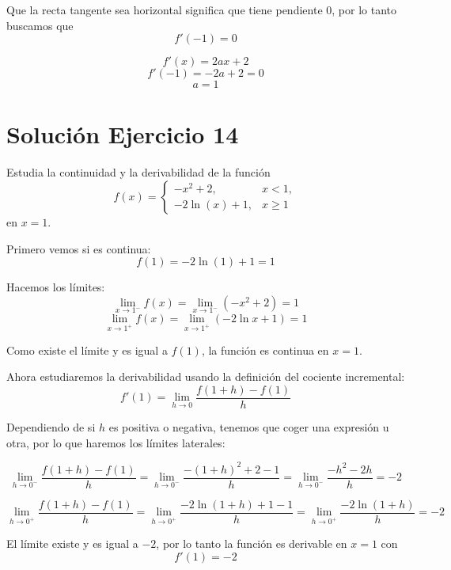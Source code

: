 \documentclass[12pt]{article}
\begin{document}
Que la recta tangente sea horizontal significa que tiene pendiente \(0\), por lo tanto
buscamos que
\[
f'(-1)=0
\]

\[
f'(x)=2ax+2
\]
\[
f'(-1)=-2a+2=0
\]
\[
a=1
\]

\section*{Solución Ejercicio 14}
Estudia la continuidad y la derivabilidad de la función
\[
f(x)=
\begin{cases}
-x^2+2, & x<1,\\
-2\ln(x)+1, & x\geq 1
\end{cases}
\]
en \(x=1\).

Primero vemos si es continua:
\[
f(1)=-2\ln(1)+1=1
\]

Hacemos los límites:
\[
\lim_{x\to 1^-} f(x)=\lim_{x\to 1^-}(-x^2+2)=1
\]
\[
\lim_{x\to 1^+} f(x)=\lim_{x\to 1^+}(-2\ln x+1)=1
\]

Como existe el límite y es igual a \(f(1)\), la función es continua en \(x=1\).

Ahora estudiaremos la derivabilidad usando la definición del cociente incremental:
\[
f'(1)=\lim_{h\to 0}\frac{f(1+h)-f(1)}{h}
\]

Dependiendo de si \(h\) es positiva o negativa, tenemos que coger una expresión u
otra, por lo que haremos los límites laterales:

\[
\lim_{h\to 0^-}\frac{f(1+h)-f(1)}{h}
=
\lim_{h\to 0^-}\frac{-(1+h)^2+2-1}{h}
=
\lim_{h\to 0^-}\frac{-h^2-2h}{h}
=-2
\]

\[
\lim_{h\to 0^+}\frac{f(1+h)-f(1)}{h}
=
\lim_{h\to 0^+}\frac{-2\ln(1+h)+1-1}{h}
=
\lim_{h\to 0^+}\frac{-2\ln(1+h)}{h}
=-2
\]

El límite existe y es igual a \(-2\), por lo tanto la función es derivable en \(x=1\) con
\[
f'(1)=-2
\]
\end{document}

